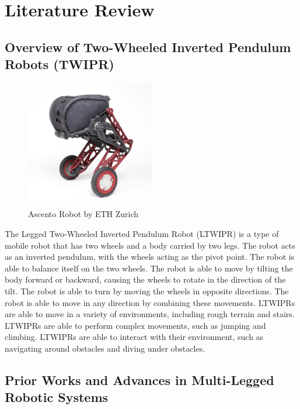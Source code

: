 \chapter{Literature Review}

\graphicspath{{./Figures/Literature Review/}}


\section{Overview of Two-Wheeled Inverted Pendulum Robots (TWIPR)}

\begin {figure}[h]
\centering
\includegraphics[width=0.5\textwidth]{Ascento robot}
\caption{Ascento Robot by ETH Zurich\cite{klemm2019ascento}}
\label{fig:Ascento robot}
\end {figure}

The Legged Two-Wheeled Inverted Pendulum Robot (LTWIPR) is a type of mobile robot that has two wheels and a body carried by two legs.
The robot acts as an inverted pendulum, with the wheels acting as the pivot point.
The robot is able to balance itself on the two wheels. The robot is able to move by tilting the body forward or backward, causing the wheels to rotate in the direction of the tilt. The robot is able to turn by moving the wheels in opposite directions. The robot is able to move in any direction by combining these movements. LTWIPRs are able to move in a variety of environments, including rough terrain and stairs. LTWIPRs are able to perform complex movements, such as jumping and climbing. LTWIPRs are able to interact with their environment, such as navigating around obstacles and diving under obstacles.



\section{Prior Works and Advances in Multi-Legged Robotic Systems}
